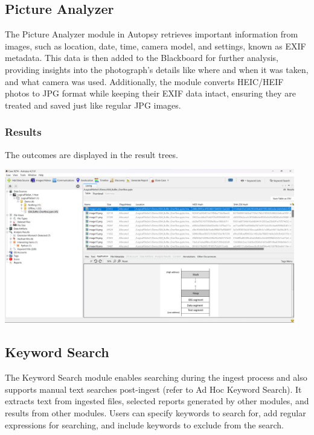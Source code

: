 \documentclass{article}
\begin{document}
\subsection{Picture Analyzer}
The Picture Analyzer module in Autopsy retrieves important information from images, such as location, date, time, camera model, and settings, known as EXIF metadata. This data is then added to the Blackboard for further analysis, providing insights into the photograph's details like where and when it was taken, and what camera was used. Additionally, the module converts HEIC/HEIF photos to JPG format while keeping their EXIF data intact, ensuring they are treated and saved just like regular JPG images.

\subsubsection*{Results}
The outcomes are displayed in the result trees.
\begin{center}
    \includegraphics[width=0.95\textwidth]{3/3.6/Picture Analyzer Results.png}
\end{center}

\subsection{Keyword Search}
The Keyword Search module enables searching during the ingest process and also supports manual text searches post-ingest (refer to Ad Hoc Keyword Search). It extracts text from ingested files, selected reports generated by other modules, and results from other modules. Users can specify keywords to search for, add regular expressions for searching, and include keywords to exclude from the search.
\end{document}
